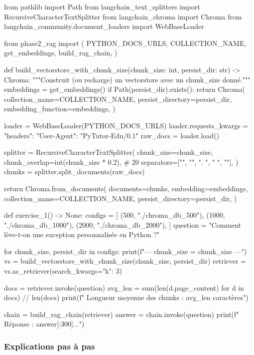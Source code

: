 \documentclass[11pt,a4paper]{article}
\begin{document}
\begin{pythoncode}
from pathlib import Path
from langchain_text_splitters import RecursiveCharacterTextSplitter
from langchain_chroma import Chroma
from langchain_community.document_loaders import WebBaseLoader

from phase2_rag import (
    PYTHON_DOCS_URLS, COLLECTION_NAME, get_embeddings, build_rag_chain,
)


def build_vectorstore_with_chunk_size(chunk_size: int, persist_dir: str) -> Chroma:
    """Construit (ou recharge) un vectorstore avec un chunk_size donné."""
    embeddings = get_embeddings()
    if Path(persist_dir).exists():
        return Chroma(
            collection_name=COLLECTION_NAME,
            persist_directory=persist_dir,
            embedding_function=embeddings,
        )

    loader = WebBaseLoader(PYTHON_DOCS_URLS)
    loader.requests_kwargs = {"headers": {"User-Agent": "PyTutor-Edu/0.1"}}
    raw_docs = loader.load()

    splitter = RecursiveCharacterTextSplitter(
        chunk_size=chunk_size,
        chunk_overlap=int(chunk_size * 0.2),       # 20%
        separators=["\n\n", "\n", ". ", " ", ""],
    )
    chunks = splitter.split_documents(raw_docs)

    return Chroma.from_documents(
        documents=chunks, embedding=embeddings,
        collection_name=COLLECTION_NAME, persist_directory=persist_dir,
    )


def exercise_1() -> None:
    configs = [
        (500,  "./chroma_db_500"),
        (1000, "./chroma_db_1000"),
        (2000, "./chroma_db_2000"),
    ]
    question = "Comment lève-t-on une exception personnalisée en Python ?"

    for chunk_size, persist_dir in configs:
        print(f"\n--- chunk_size = {chunk_size} ---")
        vs = build_vectorstore_with_chunk_size(chunk_size, persist_dir)
        retriever = vs.as_retriever(search_kwargs={"k": 3})

        docs = retriever.invoke(question)
        avg_len = sum(len(d.page_content) for d in docs) // len(docs)
        print(f"  Longueur moyenne des chunks : {avg_len} caractères")

        chain = build_rag_chain(retriever)
        answer = chain.invoke(question)
        print(f"  Réponse : {answer[:300]}...")
\end{pythoncode}

\subsubsection{Explications pas à pas}
\end{document}
